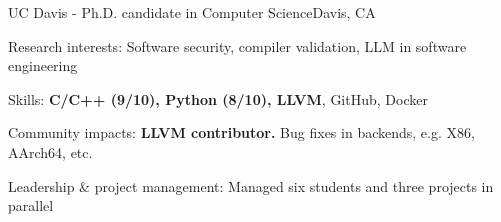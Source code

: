 \renewcommand{\timeInterval}{\DTMdisplaydate{2019}{9}{27}{-1} - }

\ifx\lang\eng
	\begin{rSubsection}{UC Davis}{\timeInterval}{Ph.D. candidate in Computer Science}{Davis, CA}
		\item Research interests: Software security, compiler validation, LLM in software engineering
		\item Skills: \textbf{C/C++ (9/10), Python (8/10), LLVM}, GitHub, Docker
		\item Community impacts: \textbf{LLVM contributor.} Bug fixes in backends, e.g. X86, AArch64, etc.
		\item Leadership \& project management: Managed six students and three projects in parallel
	\end{rSubsection}
	\vspace{-0.1em}
\else
\fi

\renewcommand{\timeInterval}{}